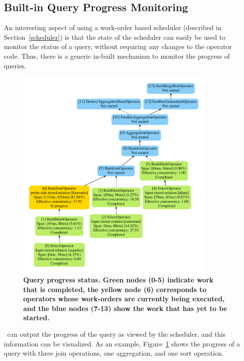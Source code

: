 \subsection{Built-in Query Progress Monitoring}\label{sec:progress-monitoring}
An interesting aspect of using a work-order based scheduler (described in Section~\ref{scheduler}) is that the state of the scheduler can easily be used to monitor the status of a query, without requiring any changes to the operator code. Thus, there is a generic in-built mechanism to monitor the progress of queries.

\begin{figure}[thb]
\centering
   \includegraphics[width=0.6\columnwidth,height=4.2in]{system/figures/q31-progress.pdf}
   \caption{\small \textbf{Query progress status. Green nodes (0-5) indicate work that is completed, the yellow node (6) corresponds to operators whose work-orders are currently being executed, and the blue nodes (7-13) show the work that has yet to be started.}}
   \label{fig-query-progress}
\end{figure}


\Quickstep\ can output the progress of the query as viewed by the scheduler, and this information can be visualized. As an example, Figure~\ref{fig-query-progress} shows the progress of a query with three join operations, one aggregation, and one sort operation.

